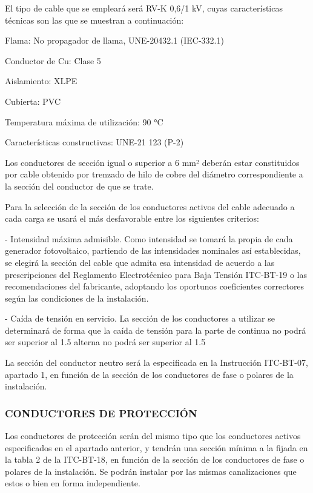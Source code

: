 \documentclass{article}
\begin{document}
El tipo de cable que se empleará será RV-K 0,6/1 kV, cuyas características técnicas son las que
se muestran a continuación:

Flama: No propagador de llama, UNE-20432.1 (IEC-332.1)

Conductor de Cu: Clase 5

Aislamiento: XLPE

Cubierta:
PVC

Temperatura máxima de utilización: 90 °C

Características constructivas: UNE-21 123 (P-2)

Los conductores de sección igual o superior a 6 mm² deberán estar constituidos por cable
obtenido por trenzado de hilo de cobre del diámetro correspondiente a la sección del conductor
de que se trate.

Para la selección de la sección de los conductores activos del cable adecuado a cada carga se
usará el más desfavorable entre los siguientes criterios:

- Intensidad máxima admisible. Como intensidad se tomará la propia de cada generador
fotovoltaico, partiendo de las intensidades nominales así establecidas, se elegirá la sección del
cable que admita esa intensidad de acuerdo a las prescripciones del Reglamento
Electrotécnico para Baja Tensión ITC-BT-19 o las recomendaciones del fabricante, adoptando
los oportunos coeficientes correctores según las condiciones de la instalación.

- Caída de tensión en servicio. La sección de los conductores a utilizar se determinará de forma
que la caída de tensión para la parte de continua no podrá ser superior al 1.5%
alterna no podrá ser superior al 1.5%

La sección del conductor neutro será la especificada en la Instrucción ITC-BT-07, apartado 1,
en función de la sección de los conductores de fase o polares de la instalación.




\subsubsection{CONDUCTORES DE PROTECCIÓN}
Los conductores de protección serán del mismo tipo que los conductores activos
especificados en el apartado anterior, y tendrán una sección mínima a la fijada en la tabla 2 de
la ITC-BT-18, en función de la sección de los conductores de fase o polares de la instalación. Se
podrán instalar por las mismas canalizaciones que estos o bien en forma independiente.
\end{document}
